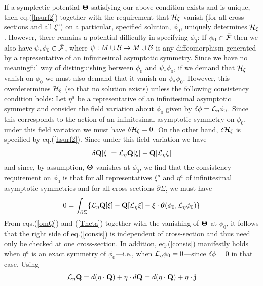 If a symplectic potential ${\mbox{\boldmath $\Theta$}}$ satisfying our
above condition exists and is unique, then eq.(\ref{hsurf2}) together
with the requirement that ${\cal H}_\xi$ vanish (for all
cross-sections and all $\xi^a$) on a particular, specified solution,
$\phi_0$, uniquely determines ${\cal H}_\xi$. However, there remains a
potential difficulty in specifying $\phi_0$: If $\phi_0 \in \bar{\cal F}$ then
we also have $\psi_* \phi_0 \in \bar{\cal F}$, where $\psi: M \cup
{\cal B} \rightarrow M \cup {\cal B}$ is any diffeomorphism generated
by a representative of an infinitesimal asymptotic symmetry. Since we
have no meaningful way of distinguishing between $\phi_0$ and $\psi_*
\phi_0$, if we demand that ${\cal H}_\xi$ vanish on $\phi_0$ we must
also demand that it vanish on $\psi_* \phi_0$. However, this
overdetermines ${\cal H}_\xi$ (so that no solution exists) unless the
following consistency condition holds: Let $\eta^a$ be a
representative of an infinitesimal asymptotic symmetry and consider
the field variation about $\phi_0$ given by $\delta \phi = {\cal
L}_\eta \phi_0$. Since this corresponds to the action of an
infinitesimal asymptotic symmetry on $\phi_0$, under this field
variation we must have $\delta {\cal H}_\xi = 0$. On the other hand,
$\delta {\cal H}_\xi$ is specified by eq.(\ref{hsurf2}). Since under
this field variation we have
\begin{equation}
\delta {\bf Q}[\xi] = {\cal L}_\eta {\bf Q}[\xi] - {\bf Q}[{\cal
L}_\eta \xi]
\label{deltaQ}
\end{equation}
and since, by assumption, ${\mbox{\boldmath $\Theta$}}$ vanishes at
$\phi_0$, we find that the consistency requirement on $\phi_0$ is that
for all representatives $\xi^a$ and $\eta^a$ of infinitesimal
asymptotic symmetries and for all cross-sections $\partial \Sigma$, we
must have
\begin{equation}
0 = \int_{\partial \Sigma} \{{\cal L}_\eta {\bf Q}[\xi] - {\bf
Q}[{\cal L}_\eta \xi] - \xi \cdot {\mbox{\boldmath
$\theta$}}(\phi_0,{\cal L}_\eta \phi_0) \}
\label{consis}
\end{equation}
From eqs.(\ref{omQ}) and (\ref{Theta}) together with the vanishing of
${\mbox{\boldmath $\Theta$}}$ at $\phi_0$, it follows that the right
side of eq.(\ref{consis}) is independent of cross-section and thus
need only be checked at one cross-section. In addition,
eq.(\ref{consis}) manifestly holds when $\eta^a$ is an exact symmetry
of $\phi_0$---i.e., when ${\cal L}_\eta \phi_0 = 0$---since $\delta
\phi = 0$ in that case. Using
\begin{equation}
{\cal L}_\eta {\bf Q} = d (\eta \cdot {\bf Q}) + \eta \cdot d {\bf Q}
= d (\eta \cdot {\bf Q}) + \eta \cdot {\bf j}
\label{lieid}
\end{equation}
